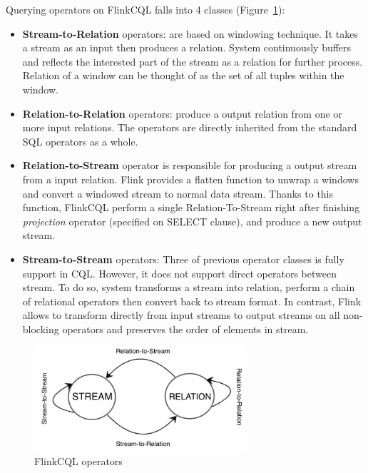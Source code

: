 Querying operators on FlinkCQL falls into 4 classes (Figure~\ref{fig:relation}):
\begin{itemize}
	\item \textbf{Stream-to-Relation} operators: are based on windowing technique. It takes a stream as an input then produces a relation. System continuously buffers and reflects the interested part of the stream as a relation for further process. Relation of a window can be thought of as the set of all tuples within the window.
	\item  \textbf{Relation-to-Relation} operators: produce a output relation from one or more input relations. The operators are directly inherited from the standard SQL operators as a whole.
	\item \textbf{Relation-to-Stream} operator is responsible for producing a output stream from a input relation. Flink provides a flatten function to unwrap a windows and convert a windowed stream to normal data stream. Thanks to this function, FlinkCQL perform a single Relation-To-Stream right after finishing \textit{projection} operator (specified on SELECT clause), and produce a new output stream.
	\item \textbf{Stream-to-Stream} operators: Three of previous operator classes is fully support in CQL. However, it does not support direct operators between stream. To do so, system transforms a stream into relation, perform a chain of relational operators then convert back to stream format. In contrast, Flink allows to transform directly from input streams to output streams on all non-blocking operators and preserves the order of elements in stream.
\end{itemize}
\begin{figure}[htbp!] 
\centering    
\includegraphics[width=0.7\textwidth]{relation}
\caption{FlinkCQL operators}
\label{fig:relation}
\end{figure}


